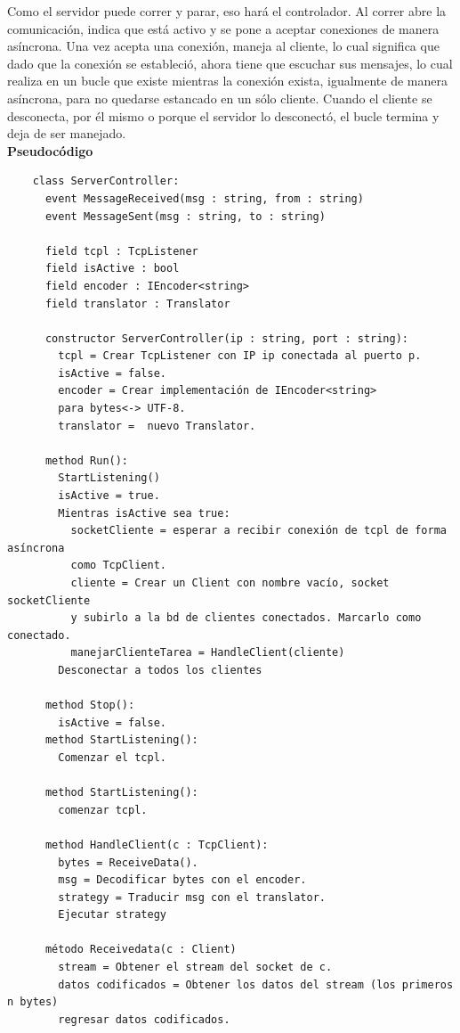  Como el servidor puede correr y parar, eso hará el controlador. Al correr abre la comunicación, indica que está activo y se pone a aceptar conexiones de manera asíncrona. Una vez acepta una conexión, maneja al cliente, lo cual significa que dado que la conexión se estableció, ahora tiene que escuchar sus mensajes, lo cual realiza en un bucle que existe mientras la conexión exista, igualmente de manera asíncrona, para no quedarse estancado en un sólo cliente. Cuando el cliente se desconecta, por él mismo o porque el servidor lo desconectó, el bucle termina y deja de ser manejado.
\\

\textbf{Pseudocódigo}

\begin{verbatim}
	class ServerController:
	  event MessageReceived(msg : string, from : string)
	  event MessageSent(msg : string, to : string)
	  
	  field tcpl : TcpListener
	  field isActive : bool
	  field encoder : IEncoder<string>
	  field translator : Translator
	  
	  constructor ServerController(ip : string, port : string):
	    tcpl = Crear TcpListener con IP ip conectada al puerto p.
	    isActive = false.
	    encoder = Crear implementación de IEncoder<string>
	    para bytes<-> UTF-8.
	    translator =  nuevo Translator.
	    
	  method Run():
	    StartListening()
	    isActive = true.
	    Mientras isActive sea true:
	      socketCliente = esperar a recibir conexión de tcpl de forma asíncrona
	      como TcpClient.
	      cliente = Crear un Client con nombre vacío, socket socketCliente
	      y subirlo a la bd de clientes conectados. Marcarlo como conectado.
	      manejarClienteTarea = HandleClient(cliente)
	    Desconectar a todos los clientes
	      
	  method Stop():
	    isActive = false.
	  method StartListening():
	    Comenzar el tcpl.
	  
	  method StartListening():
	    comenzar tcpl.
	    
	  method HandleClient(c : TcpClient):
	    bytes = ReceiveData().
	    msg = Decodificar bytes con el encoder.
	    strategy = Traducir msg con el translator.
	    Ejecutar strategy
	    
	  método Receivedata(c : Client)
	    stream = Obtener el stream del socket de c.
	    datos codificados = Obtener los datos del stream (los primeros n bytes)
	    regresar datos codificados.  
\end{verbatim}

